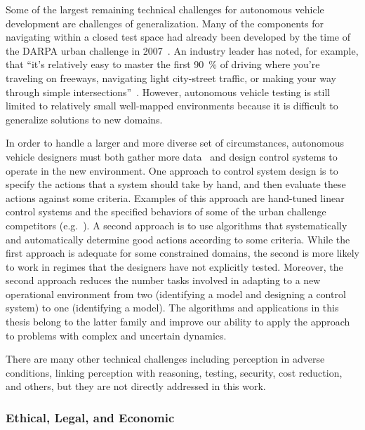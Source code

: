 Some of the largest remaining technical challenges for autonomous vehicle development are challenges of generalization.
Many of the components for navigating within a closed test space had already been developed by the time of the DARPA urban challenge in 2007~\cite{MB-KI-SS:10}.
An industry leader has noted, for example, that ``it's relatively easy to master the first \SI{90}{\percent} of driving where you're traveling on freeways, navigating light city-street traffic, or making your way through simple intersections''~\cite{dolgov2016google}.
However, autonomous vehicle testing is still limited to relatively small well-mapped environments because it is difficult to generalize solutions to new domains.

In order to handle a larger and more diverse set of circumstances, autonomous vehicle designers must both gather more data~\cite{dolgov2016google} and design control systems to operate in the new environment.
One approach to control system design is to specify the actions that a system should take by hand, and then evaluate these actions against some criteria.
Examples of this approach are hand-tuned linear control systems and the specified behaviors of some of the urban challenge competitors (e.g.~\citet{urmson2007tartan}).
A second approach is to use algorithms that systematically and automatically determine good actions according to some criteria.
While the first approach is adequate for some constrained domains, the second is more likely to work in regimes that the designers have not explicitly tested.
Moreover, the second approach reduces the number tasks involved in adapting to a new operational environment from two (identifying a model and designing a control system) to one (identifying a model).
The algorithms and applications in this thesis belong to the latter family and improve our ability to apply the approach to problems with complex and uncertain dynamics.

There are many other technical challenges including perception in adverse conditions, linking perception with reasoning, testing, security, cost reduction, and others, but they are not directly addressed in this work.

\subsubsection{Ethical, Legal, and Economic}

